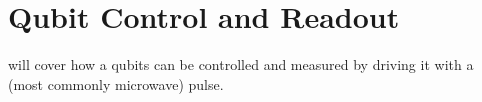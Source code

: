 \chapter{Qubit Control and Readout}
 will cover how a qubits can be controlled and measured by driving it with a (most commonly microwave) pulse. 